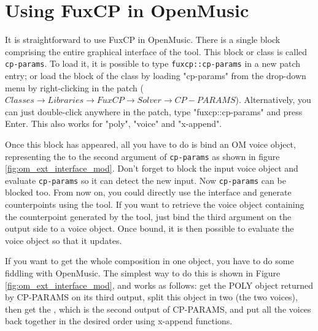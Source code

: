 \section{Using FuxCP in OpenMusic}
It is straightforward to use FuxCP in OpenMusic. There is a single block comprising the entire graphical interface of the tool. This block or class is called \texttt{cp-params}. To load it, it is possible to type \texttt{fuxcp::cp-params} in a new patch entry; or load the block of the class by loading "cp-params" from the drop-down menu by right-clicking in the patch ($Classes\to Libraries\to FuxCP\to Solver\to CP-PARAMS$). Alternatively, you can just double-click anywhere in the patch, type "fuxcp::cp-params" and press Enter. This also works for "poly", "voice" and "x-append".

Once this block has appeared, all you have to do is bind an OM voice object, representing the \cfcomma to the second argument of \texttt{cp-params} as shown in figure \ref{fig:om_ext_interface_mod}. Don't forget to block the input voice object and evaluate \texttt{cp-params} so it can detect the new input. Now \texttt{cp-params} can be blocked too. From now on, you could directly use the interface and generate counterpoints using the tool. If you want to retrieve the voice object containing the counterpoint generated by the tool, just bind the third argument on the output side to a voice object. Once bound, it is then possible to evaluate the voice object so that it updates.

If you want to get the whole composition in one object, you have to do some fiddling with OpenMusic. The simplest way to do this is shown in Figure \ref{fig:om_ext_interface_mod}, and works as follows: get the POLY object returned by CP-PARAMS on its third output, split this object in two (the two voices), then get the \cfs, which is the second output of CP-PARAMS, and put all the voices back together in the desired order using x-append functions. 

